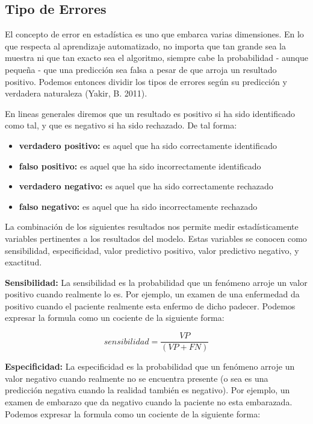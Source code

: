 \subsection{Tipo de Errores}
El concepto de error en estadística es uno que embarca varias dimensiones. En lo que respecta al aprendizaje automatizado, no importa que tan grande sea la muestra ni que tan exacto sea el algoritmo, siempre cabe la probabilidad - aunque pequeña - que una predicción sea falsa a pesar de que arroja un resultado positivo. Podemos entonces dividir los tipos de errores según su predicción y verdadera naturaleza (Yakir, B. 2011). 

En lineas generales diremos que un resultado es positivo si ha sido identificado como tal, y que es negativo si ha sido rechazado. De tal forma:
\begin{itemize}
	\item \textbf{verdadero positivo:} es aquel que ha sido correctamente identificado
	\item \textbf{falso positivo:} es aquel que ha sido incorrectamente identificado
	\item \textbf{verdadero negativo:} es aquel que ha sido correctamente rechazado
	\item \textbf{falso negativo:} es aquel que ha sido incorrectamente rechazado
\end{itemize}

La combinación de los siguientes resultados nos permite medir estadísticamente variables pertinentes a los resultados del modelo. Estas variables se conocen como sensibilidad, especificidad, valor predictivo positivo, valor predictivo negativo, y exactitud.

\textbf{Sensibilidad:} La sensibilidad es la probabilidad que un fenómeno arroje un valor positivo cuando realmente lo es. Por ejemplo, un examen de una enfermedad da positivo cuando el paciente realmente esta enfermo de dicho padecer. Podemos expresar la formula como un cociente de la siguiente forma:

\begin{equation}
sensibilidad = \frac{VP}{(VP + FN)}
\end{equation}

\textbf{Especificidad:} La especificidad es la probabilidad que un fenómeno arroje un valor negativo cuando realmente no se encuentra presente (o sea es una predicción negativa cuando la realidad también es negativo). Por ejemplo, un examen de embarazo que da negativo cuando la paciente no esta embarazada. Podemos expresar la formula como un cociente de la siguiente forma:

